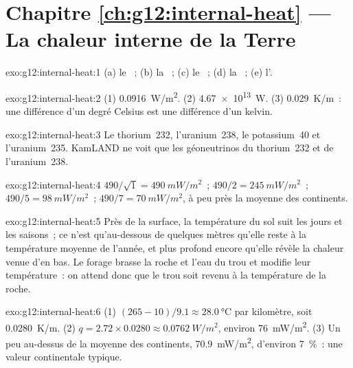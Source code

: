 \section*{Chapitre \ref{ch:g12:internal-heat} --- La chaleur interne de la Terre}

\begin{solution}{exo:g12:internal-heat:1}
(a) le ~; (b) la ~;
(c) le ~; (d) la ~;
(e) l'.
\end{solution}

\begin{solution}{exo:g12:internal-heat:2}
(1) \qty{0.0916}{W/m^2}. (2) \qty{4.67e13}{W}. (3) \qty{0.029}{K/m}~: une
différence d'un degré Celsius est une différence d'un kelvin.
\end{solution}

\begin{solution}{exo:g12:internal-heat:3}
Le thorium~232, l'uranium~238, le potassium~40 et l'uranium~235. KamLAND
ne voit que les géoneutrinos du thorium~232 et de l'uranium~238.
\end{solution}

\begin{solution}{exo:g12:internal-heat:4}
$490/\sqrt{1} = \qty{490}{mW/m^2}$~; $490/2 = \qty{245}{mW/m^2}$~;
$490/5 = \qty{98}{mW/m^2}$~; $490/7 = \qty{70}{mW/m^2}$, à peu près la
moyenne des continents.
\end{solution}

\begin{solution}{exo:g12:internal-heat:5}
Près de la surface, la température du sol suit les jours et les saisons~;
ce n'est qu'au-dessous de quelques mètres qu'elle reste à la température
moyenne de l'année, et plus profond encore qu'elle révèle la chaleur venue
d'en bas. Le forage brasse la roche et l'eau du trou et modifie leur
température~: on attend donc que le trou soit revenu à la température de la
roche.
\end{solution}

\begin{solution}{exo:g12:internal-heat:6}
(1) $(265 - 10)/9.1 \approx \qty{28.0}{\celsius}$ par kilomètre, soit
\qty{0.0280}{K/m}. (2) $q = 2.72 \times 0.0280 \approx \qty{0.0762}{W/m^2}$,
environ \qty{76}{mW/m^2}. (3) Un peu au-dessus de la moyenne des
continents, \qty{70.9}{mW/m^2}, d'environ \qty{7}{\percent}~: une valeur
continentale typique.
\end{solution}

